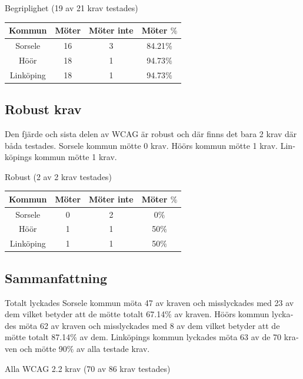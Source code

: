 \documentclass[11p]{article}
\begin{document}
\begin{otherlanguage}{swedish}
    \newpage
    \begin{center}
    Begriplighet (19 av 21 krav testades)

    \begin{tabular}{ |c|c|c|c|}
        \hline
        Kommun & Möter & Möter inte & Möter $\%$ \\  \hline
        Sorsele & 16 & 3 & 84.21$\%$ \\ \hline
        Höör & 18 & 1 & 94.73$\%$ \\ \hline
        Linköping & 18 & 1 & 94.73$\%$ \\ \hline
    \end{tabular}
    \end{center}

    \subsection{Robust krav}
    Den fjärde och sista delen av WCAG är robust och där finns det bara 2 krav där båda testades.
    Sorsele kommun mötte 0 krav.
    Höörs kommun mötte 1 krav.
    Linköpings kommun mötte 1 krav.

    \begin{center}
    Robust (2 av 2 krav testades)

    \begin{tabular}{ |c|c|c|c|}
        \hline
        Kommun & Möter & Möter inte & Möter $\%$ \\  \hline
        Sorsele & 0 & 2 & 0$\%$ \\ \hline
        Höör & 1 & 1 & 50$\%$ \\ \hline
        Linköping & 1 & 1 & 50$\%$ \\ \hline
    \end{tabular}
    \end{center}
    
    \subsection{Sammanfattning}
    Totalt lyckades Sorsele kommun möta 47 av kraven och misslyckades med 23 av dem vilket betyder att de mötte totalt 67.14$\%$ av kraven.
    Höörs kommun lyckades möta 62 av kraven och misslyckades med 8 av dem vilket betyder att de mötte totalt 87.14$\%$ av dem.
    Linköpings kommun lyckades möta 63 av de 70 kraven och mötte 90$\%$ av alla testade krav.

    \begin{center}
    Alla WCAG 2.2 krav (70 av 86 krav testades)


\end{center}
\end{otherlanguage}
\end{document}
